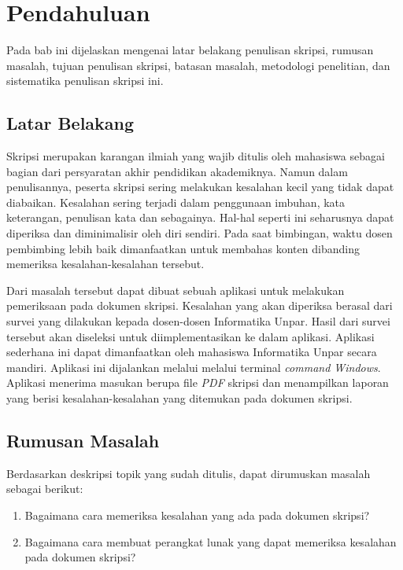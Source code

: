 \chapter{Pendahuluan}
\label{chap:intro}
   
Pada bab ini dijelaskan mengenai latar belakang penulisan skripsi, rumusan masalah, tujuan penulisan skripsi, batasan masalah, metodologi penelitian, dan sistematika penulisan skripsi ini.

\section{Latar Belakang}
\label{sec:label}

Skripsi merupakan karangan ilmiah yang wajib ditulis oleh mahasiswa sebagai bagian dari persyaratan akhir pendidikan akademiknya. Namun dalam penulisannya, peserta skripsi sering melakukan kesalahan kecil yang tidak dapat diabaikan. Kesalahan sering terjadi dalam penggunaan imbuhan, kata keterangan, penulisan kata dan sebagainya. Hal-hal seperti ini seharusnya dapat diperiksa dan diminimalisir oleh diri sendiri. Pada saat bimbingan, waktu dosen pembimbing lebih baik dimanfaatkan untuk membahas konten dibanding memeriksa kesalahan-kesalahan tersebut. 

Dari masalah tersebut dapat dibuat sebuah aplikasi untuk melakukan pemeriksaan pada dokumen skripsi. Kesalahan yang akan diperiksa berasal dari survei yang dilakukan kepada dosen-dosen Informatika Unpar. Hasil dari survei tersebut akan diseleksi untuk diimplementasikan ke dalam aplikasi. Aplikasi sederhana ini dapat dimanfaatkan oleh mahasiswa Informatika Unpar secara mandiri. Aplikasi ini dijalankan melalui melalui terminal \textit{command Windows}. Aplikasi menerima masukan berupa file \textit{PDF} skripsi dan menampilkan laporan yang berisi kesalahan-kesalahan yang ditemukan pada dokumen skripsi. 


\section{Rumusan Masalah}
\label{sec:rumusan}
Berdasarkan deskripsi topik yang sudah ditulis, dapat dirumuskan masalah sebagai berikut:
\begin{enumerate}
	\item Bagaimana cara memeriksa kesalahan yang ada pada dokumen skripsi?
	\item Bagaimana cara membuat perangkat lunak yang dapat memeriksa kesalahan pada dokumen skripsi?
\end{enumerate}

